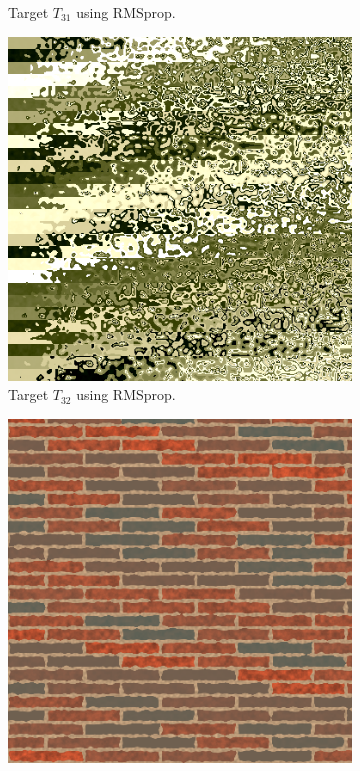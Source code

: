 \begin{figure}[h]
\begin{subfigure}[t]{.25\textwidth}
    \caption{Target $T_{31}$ using RMSprop.}
    \label{fig:M3NeuralFinalRendersTwoParamRMSprop}
\end{subfigure}\hspace{0.7cm}
\begin{subfigure}[t]{.25\textwidth}
    \centering
    \includegraphics[width=\linewidth]{img/evaluation/M3/random/Neural_RMSprop_random_final.png}
    \caption{Target $T_{32}$ using RMSprop.}
    \label{fig:M3NeuralFinalRendersRandomRMSprop}
\end{subfigure}\hspace{0.7cm}
\begin{subfigure}[t]{.25\textwidth}
    \centering
    \includegraphics[width=\linewidth]{img/evaluation/M3/real life/Neural_RMSprop_real_life_final.png}

\end{subfigure}
\end{figure}
